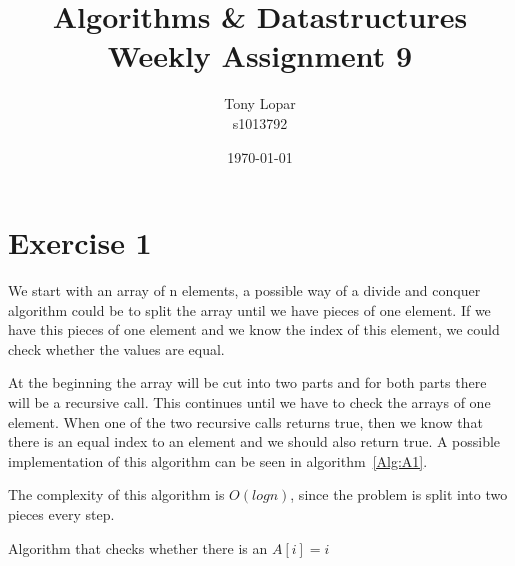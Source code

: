 \documentclass{article}
\begin{document}
\title{Algorithms \& Datastructures \\ Weekly Assignment 9}
\date{\today}
\author{Tony Lopar \\ s1013792}
\maketitle
\section*{Exercise 1}
We start with an array of n elements, a possible way of a divide and conquer algorithm could be to split the array until we have pieces of one element. If we have this pieces of one element and we know the index of this element, we could check whether the values are equal.

At the beginning the array will be cut into two parts and for both parts there will be a recursive call. This continues until we have to check the arrays of one element. When one of the two recursive calls returns true, then we know that there is an equal index to an element and we should also return true. A possible implementation of this algorithm can be seen in algorithm~\ref{Alg:A1}.

The complexity of this algorithm is $O(log n)$, since the problem is split into two pieces every step.

\begin{algorithm}[ht!]
  \DontPrintSemicolon

    \caption{Algorithm that checks whether there is an $A[i] = i$} \label{Alg:A1}
\end{algorithm}

\newpage
\end{document}
